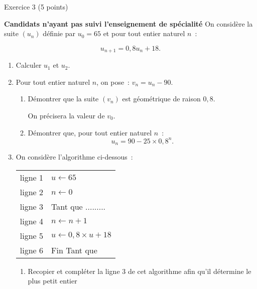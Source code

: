 
\begin{h2}Exercice 3 (5 points)\end{h2}
\textbf{Candidats n'ayant pas suivi l'enseignement de spécialité}
\medskip
On considère la suite $\left(u_n\right)$ définie par $u_0 = 65$ et pour tout entier naturel $n$~:
\par
\[u_{n+1} = 0,8u_n + 18.\]
\medskip
\begin{enumerate}
     \item Calculer $u_1$ et $u_2$.
     \item Pour tout entier naturel $n$, on pose~: $v_n = u_n - 90$.
     \begin{enumerate}[label=\alph*.]
          \item Démontrer que la suite $\left(v_n\right)$ est géométrique de raison $0,8$.
          \par
          On précisera la valeur de $v_0$.
          \item Démontrer que, pour tout entier naturel $n$~:
          \[u_n = 90 - 25 \times  0,8^n.\]
     \end{enumerate}
     \item  On considère l'algorithme ci-dessous~:
     \begin{center}
          \begin{extern}%
               \begin{tabularx}{0.5\linewidth}{|c|X|}\hline
                    ligne 1&$u \gets 65$\\
                    ligne 2&$n \gets 0$\\
                    ligne 3&Tant que .........\\
                    ligne 4&\hspace{1cm}$n \gets n+1$\\
                    ligne 5&\hspace{1cm}$u \gets 0,8 \times u + 18$\\
                    ligne 6&Fin Tant que\\ \hline
               \end{tabularx}
          \end{extern}
     \end{center}
     \medskip
     \begin{enumerate}[label=\alph*.]
          \item Recopier et compléter la ligne 3 de cet algorithme afin qu'il détermine le plus petit entier

\end{enumerate}
\end{enumerate}
